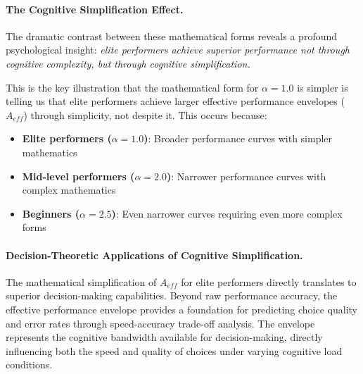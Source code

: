 \documentclass{article}
\begin{document}
\paragraph{The Cognitive Simplification Effect.} The dramatic contrast between these mathematical forms reveals a 
profound psychological insight: \textit{elite performers achieve superior performance not through cognitive complexity, 
but through cognitive simplification.}

This is the key illustration that the mathematical form for $\alpha = 1.0$ is simpler is telling us that elite
performers achieve larger effective performance envelopes ($A_{eff}$) through simplicity, not despite it.  This occurs
because:

\begin{itemize}
    \item \textbf{Elite performers ($\alpha = 1.0$)}: Broader performance curves with simpler mathematics
    \item \textbf{Mid-level performers ($\alpha = 2.0$)}: Narrower performance curves with complex mathematics  
    \item \textbf{Beginners ($\alpha = 2.5$)}: Even narrower curves requiring even more complex forms
\end{itemize}

\paragraph{Decision-Theoretic Applications of Cognitive Simplification.} The mathematical simplification of $A_{eff}$ 
for elite performers directly translates to superior decision-making capabilities. Beyond raw performance accuracy, 
the effective performance envelope provides a foundation for predicting choice quality and error rates through 
speed-accuracy trade-off analysis. The envelope represents the cognitive bandwidth available for decision-making, 
directly influencing both the speed and quality of choices under varying cognitive load conditions.
\end{document}
